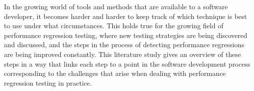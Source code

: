 In the growing world of tools and methods that are available to a software developer, it becomes harder and harder to keep track of which technique is best to use under what circumstances. This holds true for the growing field of performance regression testing, where new testing strategies are being discovered and discussed, and the steps in the process of detecting performance regressions are being improved constantly. This literature study gives an overview of these steps in a way that links each step to a point in the software development process corresponding to the challenges that arise when dealing with performance regression testing in practice.
